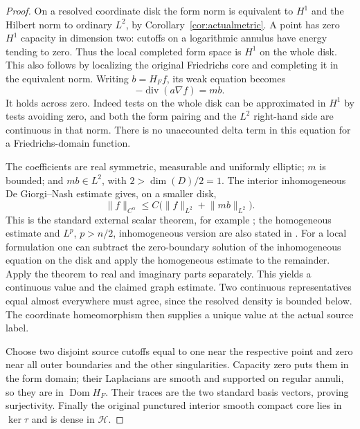\documentclass[11pt]{article}
\theoremstyle{remark}\newtheorem{remark}[theorem]{Remark}
\newcommand{\Dom}{\operatorname{Dom}}\newcommand{\dd}{\,d}
\newcommand{\norm}[1]{\lVert#1\rVert}
\begin{document}
\begin{proof}
On a resolved coordinate disk the form norm is equivalent to $H^1$ and
the Hilbert norm to ordinary $L^2$, by Corollary~\ref{cor:actualmetric}.
A point has zero $H^1$ capacity in dimension two: cutoffs on a logarithmic
annulus have energy tending to zero. Thus the local completed form space
is $H^1$ on the whole disk. This also follows by localizing the original
Friedrichs core and completing it in the equivalent norm.
Writing $b=H_Ff$, its weak equation becomes
\[
 -\operatorname{div}(a\nabla f)=mb.
\]
It holds across zero. Indeed tests on the whole disk can be approximated
in $H^1$ by tests avoiding zero, and both the form pairing and the $L^2$
right-hand side are continuous in that norm. There is no unaccounted delta
term in this equation for a Friedrichs-domain function.

The coefficients are real symmetric, measurable and uniformly elliptic;
$m$ is bounded; and $mb\in L^2$, with $2>\dim(D)/2=1$.
The interior inhomogeneous De Giorgi--Nash estimate gives, on a smaller disk,
\[
 \norm f_{C^\alpha}\leq C\bigl(\norm f_{L^2}+\norm{mb}_{L^2}\bigr).
\]
This is the standard external scalar theorem, for example
\cite[Theorem 8.24]{gt}; the homogeneous estimate and $L^p$, $p>n/2$,
inhomogeneous version are also stated in \cite[Questions 52,58]{silvestre}.
For a local formulation one can subtract the zero-boundary solution of the
inhomogeneous equation on the disk and apply the homogeneous estimate to
the remainder. Apply the theorem to real and imaginary parts separately.
This yields a continuous value and the claimed graph estimate.
Two continuous representatives equal almost everywhere must agree, since
the resolved density is bounded below. The coordinate homeomorphism
then supplies a unique value at the actual source label.

Choose two disjoint source cutoffs equal to one near the respective point
and zero near all outer boundaries and the other singularities. Capacity
zero puts them in the form domain; their Laplacians are smooth and supported
on regular annuli, so they are in $\Dom H_F$. Their traces are the two
standard basis vectors, proving surjectivity. Finally the original punctured
interior smooth compact core lies in $\ker\tau$ and is dense in $\mathcal H$.
\end{proof}
\end{document}
